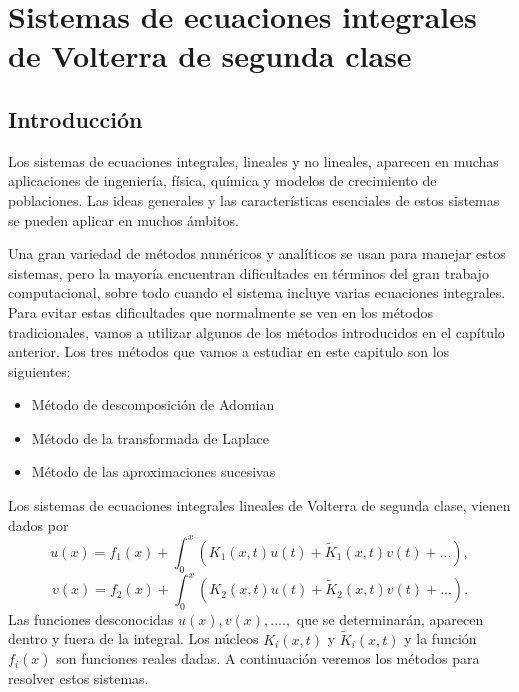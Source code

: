 \chapter{Sistemas de ecuaciones integrales de Volterra de segunda clase}
\section{Introducción}
Los sistemas de ecuaciones integrales, lineales y no lineales, aparecen en muchas aplicaciones de ingeniería, física, química y modelos de crecimiento de poblaciones. Las ideas generales y las características esenciales de estos sistemas se pueden aplicar en muchos ámbitos.

Una gran variedad de métodos numéricos y analíticos se usan para manejar estos sistemas, pero la mayoría encuentran dificultades en términos del gran trabajo computacional, sobre todo cuando el sistema incluye varias ecuaciones integrales. Para evitar estas dificultades que normalmente se ven en los métodos tradicionales, vamos a utilizar algunos de los métodos introducidos en el capítulo anterior. Los tres métodos que vamos a estudiar en este capitulo son los siguientes:
\begin{itemize}
	\item Método de descomposición de Adomian
	\item Método de la transformada de Laplace
	\item Método de las aproximaciones sucesivas
\end{itemize}

Los sistemas de ecuaciones integrales lineales de Volterra de segunda clase, vienen dados por
\begin{equation}
	u(x) = f_1(x) + \int_{0}^{x}(K_1(x,t)u(t) + \tilde{K}_1(x,t)v(t)+...),
\end{equation}
\begin{equation}
	v(x) = f_2(x) + \int_{0}^{x}(K_2(x,t)u(t) + \tilde{K}_2(x,t)v(t)+...).
\end{equation}
Las funciones desconocidas $u(x), v(x), .... ,$ que se determinarán, aparecen dentro y fuera de la integral. Los núcleos $K_i(x,t)$ y $\tilde{K}_i(x,t)$ y la función $f_i(x)$ son funciones reales dadas. A continuación veremos los métodos para resolver estos sistemas.
